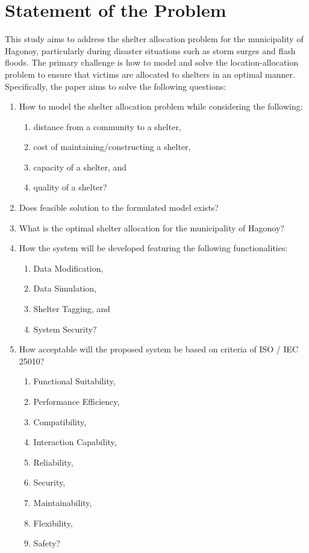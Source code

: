 \section{Statement of the Problem}

This study aims to address the shelter allocation problem for the municipality of Hagonoy, particularly during disaster situations such as storm surges and flash floods. The primary challenge is how to model and solve the location-allocation problem to ensure that victims are allocated to shelters in an optimal manner. Specifically, the paper aims to solve the following questions:

\begin{enumerate}
	\item How to model the shelter allocation problem while considering the following:
	\begin{enumerate}
		\item distance from a community to a shelter,
		\item cost of maintaining/constructing a shelter,
		\item capacity of a shelter, and
		\item quality  of a shelter?
	\end{enumerate}
	\item Does feasible solution to the formulated model exists?
	\item What is the optimal shelter allocation for the municipality of Hagonoy?
	\item How the system will be developed featuring the following functionalities:
	\begin{enumerate}
		\item Data Modification,
		\item Data Simulation,
		\item Shelter Tagging, and
		\item System Security?
	\end{enumerate}
	\item How acceptable will the proposed system be based on criteria of ISO / IEC 25010?
	\begin{enumerate}
		\item Functional Suitability,
		\item Performance Efficiency,
		\item Compatibility,
		\item Interaction Capability,
		\item Reliability,
		\item Security,
		\item Maintainability,
		\item Flexibility,
		\item Safety?
	\end{enumerate}
\end{enumerate}